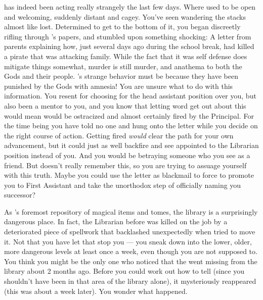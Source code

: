 \documentclass[char]{GL2020}
\begin{document}
\cLibrarian{} has indeed been acting really strangely the last few days. Where \cLibrarian{\they} used to be open and welcoming, \cLibrarian{\theyare} suddenly distant and cagey. You've seen \cLibrarian{\them} wandering the stacks almost like \cLibrarian{\theywere} lost. Determined to get to the bottom of it, you began discreetly rifling through \cLibrarian{}’s papers, and stumbled upon something shocking: A letter from \cLibrarian{\their} parents explaining how, just several days ago during the school break, \cLibrarian{\they} had killed a pirate that was attacking \cLibrarian{\their} family. While the fact that it was self defense does mitigate things somewhat, murder is still murder, and anathema to both the Gods and their people. \cLibrarian{}’s strange behavior must be because they have been punished by the Gods with amnesia! You are unsure what to do with this information. You resent \cLibrarian{} for choosing \cAmbition{} for the head assistant position over you, but \cLibrarian{\theyhave} \cLibrarian{\have} also been a mentor to you, and you know that letting word get out about this would mean \cLibrarian{\they} would be ostracized and almost certainly fired by the Principal. For the time being you have told no one and hung onto the letter while you decide on the right course of action. Getting \cLibrarian{} fired \emph{would}  clear the path for your own advancement, but it could just as well backfire and see \cAmbition{} appointed to the Librarian position instead of you. And you would be betraying someone who you see as a friend. But \cLibrarian{} doesn’t really remember this, so you are trying to assuage yourself with this truth. Maybe you could use the letter as blackmail to force \cLibrarian{} to promote you to First Assistant and take the unorthodox step of officially naming you \cLibrarian{\their} successor?  

As \pEarth{}'s foremost repository of magical items and tomes, the library is a surprisingly dangerous place. In fact, the Librarian before \cLibrarian{} was killed on the job by a deteriorated piece of spellwork that backlashed unexpectedly when \cLibrarian{\they} tried to move it. Not that you have let that stop you — you sneak down into the lower, older, more dangerous levels at least once a week, even though you are not supposed to. You think you might be the only one who noticed that the \iScythe{} went missing from the library about 2 months ago. Before you could work out how to tell \cLibrarian{} (since you shouldn't have been in that area of the library alone), it mysteriously reappeared (this was about a week later). You wonder what happened.
\end{document}
